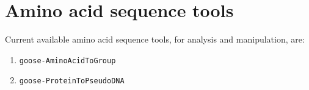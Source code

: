 \chapter{Amino acid sequence tools}
\label{seq}

Current available amino acid sequence tools, for analysis and manipulation, are:
\begin{enumerate}
\item \texttt{goose-AminoAcidToGroup}
\item \texttt{goose-ProteinToPseudoDNA}
\end{enumerate}



